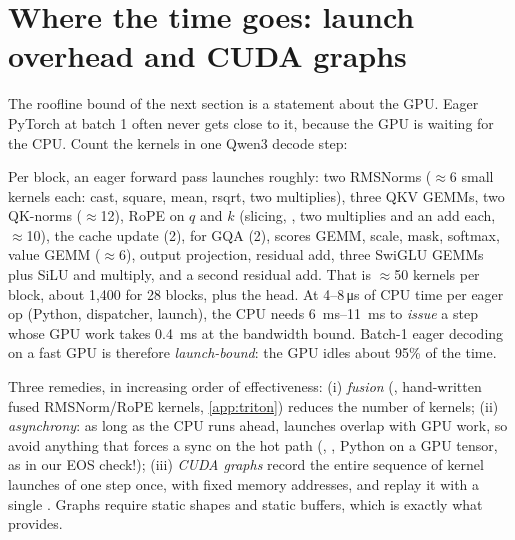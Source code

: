 \section{Where the time goes: launch overhead and CUDA graphs}\label{sec:inference:overhead}

The roofline bound of the next section is a statement about the GPU. Eager PyTorch at batch 1 often
never gets close to it, because the GPU is waiting for the CPU. Count the kernels in one Qwen3
decode step:

\begin{napkinmath}
Per block, an eager forward pass launches roughly: two RMSNorms ($\approx$6 small kernels each:
cast, square, mean, rsqrt, two multiplies), three QKV GEMMs, two QK-norms ($\approx$12), RoPE on
$q$ and $k$ (slicing, , two multiplies and an add each, $\approx$10), the cache update
(2),  for GQA (2), scores GEMM, scale, mask, softmax, value GEMM ($\approx$6),
output projection, residual add, three SwiGLU GEMMs plus SiLU and multiply, and a second residual
add. That is $\approx$50 kernels per block, about 1,400 for 28 blocks, plus the head.
At 4--8\,\si{\micro s} of CPU time per eager op (Python, dispatcher, launch), the CPU needs
\SIrange{6}{11}{ms} to \emph{issue} a step whose GPU work takes \SI{0.4}{ms} at the bandwidth bound.
Batch-1 eager decoding on a fast GPU is therefore \emph{launch-bound}: the GPU idles about 95\% of the time.
\end{napkinmath}

Three remedies, in increasing order of effectiveness: (i) \emph{fusion} (,
hand-written fused RMSNorm/RoPE kernels, \cref{app:triton}) reduces the number of kernels;
(ii) \emph{asynchrony}: as long as the CPU runs ahead, launches overlap with GPU work, so avoid
anything that forces a sync on the hot path (, , Python  on a
GPU tensor, as in our EOS check!); (iii) \emph{CUDA graphs} record the entire sequence of kernel
launches of one step once, with fixed memory addresses, and replay it with a single
. Graphs require static shapes and static buffers, which is exactly what
 provides.

